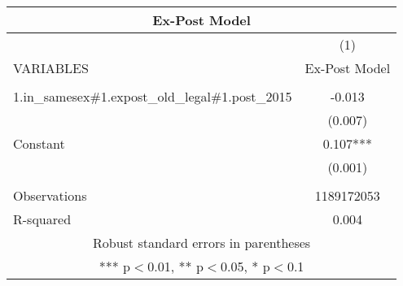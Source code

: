 \documentclass[]{article}
\begin{document}
\begin{tabular}{lc}
\multicolumn{2}{c}{Ex-Post Model} \\ \hline
 & (1) \\
VARIABLES & Ex-Post Model \\ \hline
 &  \\
1.in\_samesex\#1.expost\_old\_legal\#1.post\_2015 & -0.013 \\
 & (0.007) \\
Constant & 0.107*** \\
 & (0.001) \\
 &  \\
Observations & 1189172053 \\
 R-squared & 0.004 \\ \hline
\multicolumn{2}{c}{ Robust standard errors in parentheses} \\
\multicolumn{2}{c}{ *** p$<$0.01, ** p$<$0.05, * p$<$0.1} \\
\end{tabular}
\end{document}
